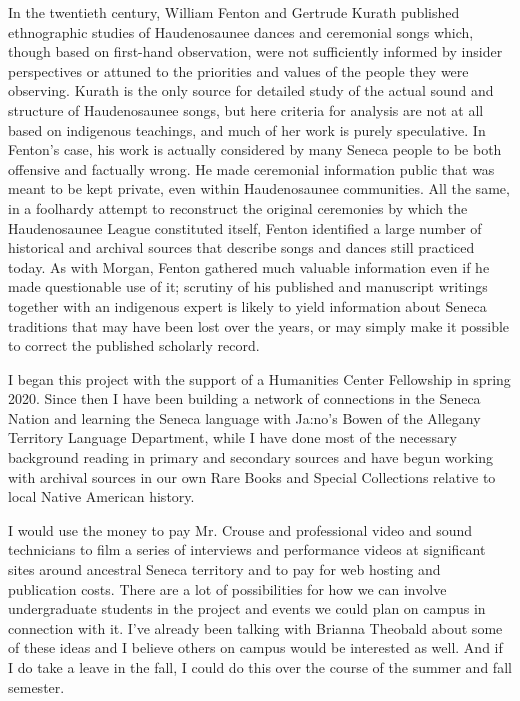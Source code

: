 \documentclass[12pt]{article}
\begin{document}
In the twentieth century, William Fenton and Gertrude Kurath published
ethnographic studies of Haudenosaunee dances and ceremonial songs which,
though based on first-hand observation, were not sufficiently informed by
insider perspectives or attuned to the priorities and values of the people
they were observing. 
Kurath is the only source for detailed study of the actual sound and structure
of Haudenosaunee songs, but here criteria for analysis are not at all based on
indigenous teachings, and much of her work is purely speculative.
In Fenton's case, his work is actually considered by many Seneca people to be
both offensive and factually wrong.
He made ceremonial information public that was meant to be kept private, even
within Haudenosaunee communities.
All the same, in a foolhardy attempt to reconstruct the original ceremonies by
which the Haudenosaunee League constituted itself, Fenton identified a large
number of historical and archival sources that describe songs and dances still
practiced today.
As with Morgan, Fenton gathered much valuable information even if he made
questionable use of it; scrutiny of his published and manuscript writings
together with an indigenous expert is likely to yield information about Seneca
traditions that may have been lost over the years, or may simply make it
possible to correct the published scholarly record.

I began this project with the support of a Humanities Center Fellowship in
spring 2020. 
Since then I have been building a network of connections in the Seneca Nation 
and learning the Seneca language with Ja:no's Bowen of the Allegany Territory
Language Department, while I have done most of the necessary background
reading in primary and secondary sources and have begun working with archival
sources in our own Rare Books and Special Collections relative to local Native
American history.

I would use the money to pay Mr. Crouse and professional video and sound
technicians to film a series of interviews and performance videos at
significant sites around ancestral Seneca territory and to pay for web hosting
and publication costs. 
There are a lot of possibilities for how we can involve
undergraduate students in the project and events we could plan on campus in
connection with it.
I’ve already been talking with Brianna Theobald about some of these ideas and
I believe others on campus would be interested as well. 
And if I do take a leave in the fall, I could do this over the course of the
summer and fall semester.
\end{document}
